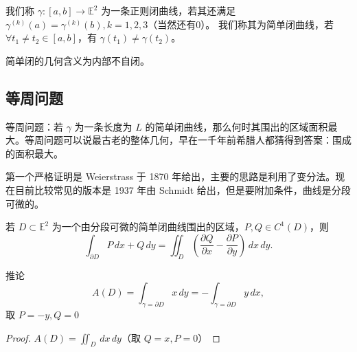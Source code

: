\documentclass[lang=cn,10pt,thmcnt=section]{elegantbook}
\begin{document}
    \begin{definition}\label{def:closed_curve}
    我们称 $\gamma : [a, b] \rightarrow \mathbb{E}^2$ 为一条正则闭曲线，若其还满足 $\gamma^{(k)}(a) = \gamma^{(k)}(b), k = 1, 2, 3$（当然还有0）。
    我们称其为简单闭曲线，若 $\forall t_1 \neq t_2 \in [a, b]$，有 $\gamma(t_1) \neq \gamma(t_2)$。
    
    
    \begin{remark}
        简单闭的几何含义为内部不自闭。
    \end{remark}
   
\end{definition}
\subsection{等周问题}
等周问题：若 $\gamma$ 为一条长度为 $L$ 的简单闭曲线，那么何时其围出的区域面积最大。等周问题可以说最古老的整体几何，早在一千年前希腊人都猜得到答案：围成的面积最大。

第一个严格证明是 Weierstrass 于 1870 年给出，主要的思路是利用了变分法。现在目前比较常见的版本是 1937 年由 Schmidt 给出，但是要附加条件，曲线是分段可微的。

\begin{theorem}[Green 定理]\label{thm:green}
     若 $D \subset \mathbb{E}^2$ 为一个由分段可微的简单闭曲线围出的区域，$P, Q \in C^1(D)$，则
    \[
    \int_{\partial D} P \, dx + Q \, dy = \iint_D \left( \frac{\partial Q}{\partial x} - \frac{\partial P}{\partial y} \right) \, dx \, dy.
    \]
    \end{theorem}
    
    推论
    \[
    A(D) = \int_{\gamma = \partial D} x \, dy = -\int_{\gamma = \partial D} y \, dx,
    \]
    取 $P = -y, Q = 0$
    \begin{proof}
        $A(D) = \iint_D \, dx \, dy$（取 $Q = x, P = 0$）
    \end{proof}
    
\end{document}
